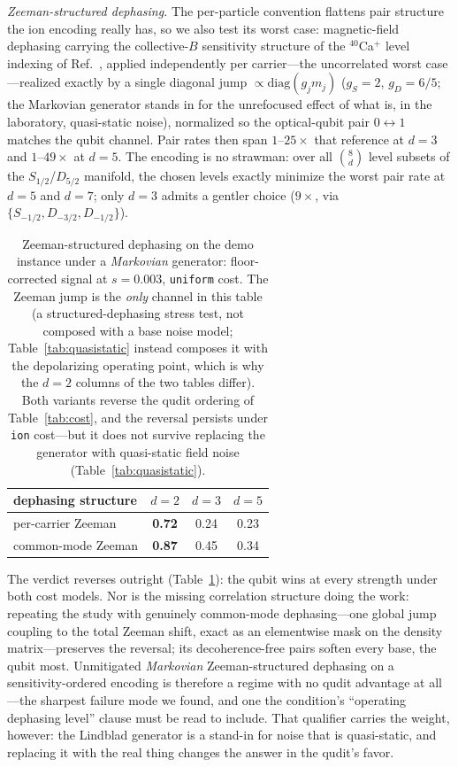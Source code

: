 \documentclass[aps,pra,reprint,superscriptaddress,nofootinbib,floatfix]{revtex4-2}
\begin{document}
\emph{Zeeman-structured dephasing.} The per-particle convention
flattens pair structure the ion encoding really has, so we also test
its worst case: magnetic-field dephasing carrying the collective-$B$
sensitivity structure of the $^{40}$Ca$^{+}$ level indexing of
Ref.~\cite{ringbauer2022}, applied independently per carrier---the
uncorrelated worst case---realized exactly by a single diagonal jump
$\propto\mathrm{diag}(g_j m_j)$ ($g_S=2$, $g_D=6/5$; the Markovian
generator stands in for the unrefocused effect of what is, in the
laboratory, quasi-static noise), normalized so the optical-qubit pair
$0{\leftrightarrow}1$ matches the qubit channel. Pair rates then span
$1$--$25\times$ that reference at $d=3$ and $1$--$49\times$ at $d=5$.
The encoding is no strawman: over all $\binom{8}{d}$ level subsets of
the $S_{1/2}$/$D_{5/2}$ manifold, the chosen levels exactly minimize
the worst pair rate at $d=5$ and $d=7$; only $d=3$ admits a gentler
choice ($9\times$, via $\{S_{-1/2},D_{-3/2},D_{-1/2}\}$).

\begin{table}[t]
\caption{Zeeman-structured dephasing on the demo instance under a
\emph{Markovian} generator: floor-corrected signal at $s=0.003$,
\texttt{uniform} cost. The Zeeman jump is the \emph{only} channel in
this table (a structured-dephasing stress test, not composed with a
base noise model; Table~\ref{tab:quasistatic} instead composes it
with the depolarizing operating point, which is why the $d=2$ columns
of the two tables differ). Both variants reverse the qudit ordering of
Table~\ref{tab:cost}, and the reversal persists under \texttt{ion}
cost---but it does not survive replacing the generator with
quasi-static field noise (Table~\ref{tab:quasistatic}).}
\label{tab:zeeman}
\begin{ruledtabular}
\begin{tabular}{lccc}
dephasing structure & $d{=}2$ & $d{=}3$ & $d{=}5$ \\
\hline
per-carrier Zeeman & \textbf{0.72} & 0.24 & 0.23 \\
common-mode Zeeman & \textbf{0.87} & 0.45 & 0.34 \\
\end{tabular}
\end{ruledtabular}
\end{table}

The verdict reverses outright (Table~\ref{tab:zeeman}): the qubit
wins at every strength under both cost models. Nor is the missing
correlation structure doing the work: repeating the study with
genuinely common-mode dephasing---one global jump coupling to the
total Zeeman shift, exact as an elementwise mask on the density
matrix---preserves the reversal; its decoherence-free pairs soften
every base, the qubit most. Unmitigated \emph{Markovian}
Zeeman-structured dephasing on a sensitivity-ordered encoding is
therefore a regime with no qudit advantage at all---the sharpest
failure mode we found, and one the condition's ``operating dephasing
level'' clause must be read to include. That qualifier carries the
weight, however: the Lindblad generator is a stand-in for noise that
is quasi-static, and replacing it with the real thing changes the
answer in the qudit's favor.
\end{document}
